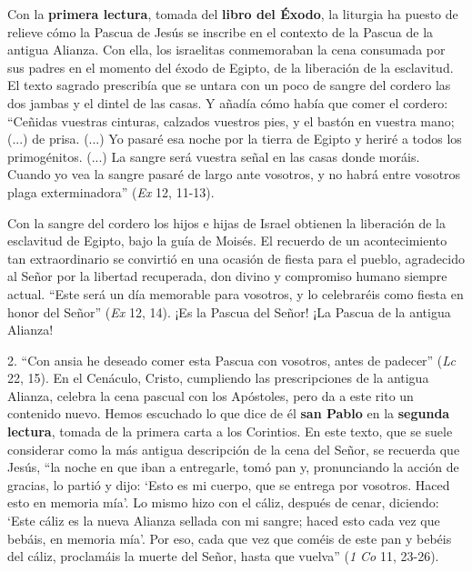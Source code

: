 			\begin{body}Con la \textbf{primera lectura}, tomada del \textbf{libro del Éxodo}, la liturgia ha puesto de relieve cómo la Pascua de Jesús se inscribe en el contexto de la Pascua de la antigua Alianza. Con ella, los israelitas conmemoraban la cena consumada por sus padres en el momento del éxodo de Egipto, de la liberación de la esclavitud. El texto sagrado prescribía que se untara con un poco de sangre del cordero las dos jambas y el dintel de las casas. Y añadía cómo había que comer el cordero: “Ceñidas vuestras cinturas, calzados vuestros pies, y el bastón en vuestra mano; (...) de prisa. (...) Yo pasaré esa noche por la tierra de Egipto y heriré a todos los primogénitos. (...) La sangre será vuestra señal en las casas donde moráis. Cuando yo vea la sangre pasaré de largo ante vosotros, y no habrá entre vosotros plaga exterminadora” (\textit{Ex} 12, 11-13).\end{body}
			
			\begin{body}Con la sangre del cordero los hijos e hijas de Israel obtienen la liberación de la esclavitud de Egipto, bajo la guía de Moisés. El recuerdo de un acontecimiento tan extraordinario se convirtió en una ocasión de fiesta para el pueblo, agradecido al Señor por la libertad recuperada, don divino y compromiso humano siempre actual. “Este será un día memorable para vosotros, y lo celebraréis como fiesta en honor del Señor” (\textit{Ex} 12, 14). ¡Es la Pascua del Señor! ¡La Pascua de la antigua Alianza!\end{body}
			
			\begin{body}2. “Con ansia he deseado comer esta Pascua con vosotros, antes de padecer” (\textit{Lc} 22, 15). En el Cenáculo, Cristo, cumpliendo las prescripciones de la antigua Alianza, celebra la cena pascual con los Apóstoles, pero da a este rito un contenido nuevo. Hemos escuchado lo que dice de él \textbf{san Pablo} en la \textbf{segunda lectura}, tomada de la primera carta a los Corintios. En este texto, que se suele considerar como la más antigua descripción de la cena del Señor, se recuerda que Jesús, “la noche en que iban a entregarle, tomó pan y, pronunciando la acción de gracias, lo partió y dijo: ‘Esto es mi cuerpo, que se entrega por vosotros. Haced esto en memoria mía’. Lo mismo hizo con el cáliz, después de cenar, diciendo: ‘Este cáliz es la nueva Alianza sellada con mi sangre; haced esto cada vez que bebáis, en memoria mía’. Por eso, cada que vez que coméis de este pan y bebéis del cáliz, proclamáis la muerte del Señor, hasta que vuelva” (\textit{1 Co} 11, 23-26).\end{body}
			

